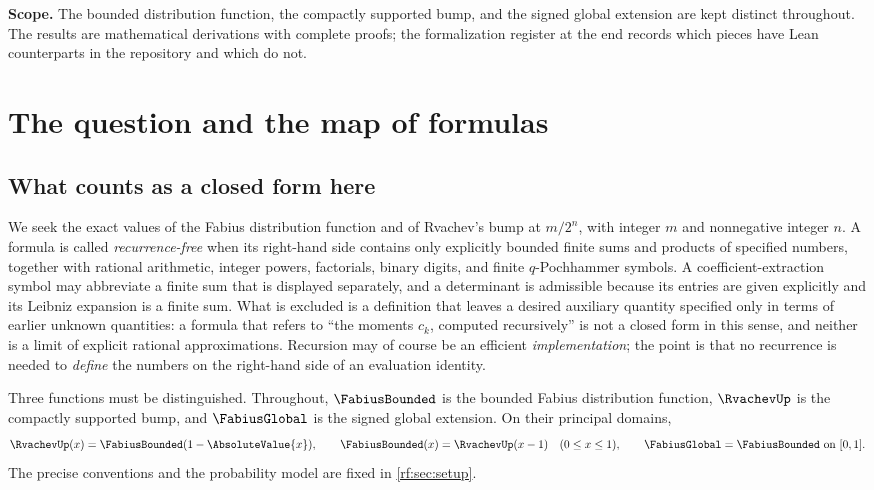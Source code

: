 \documentclass[11pt,oneside]{article}
\theoremstyle{plain}
\theoremstyle{definition}
\theoremstyle{remark}
\newcommand{\Fb}{\FabiusBounded}            %
\newcommand{\Fg}{\FabiusGlobal}             %
\newcommand{\up}{\RvachevUp}                %
\begin{document}
\vfill
\noindent\textbf{Scope.}  The bounded distribution function, the compactly
supported bump, and the signed global extension are kept distinct
throughout.  The results are mathematical derivations with complete proofs;
the formalization register at the end records which pieces have Lean
counterparts in the repository and which do not.

\clearpage
\tableofcontents
\clearpage

\section{The question and the map of formulas}
\label{rf:sec:intro}

\subsection{What counts as a closed form here}
\label{rf:sec:intro-closed}

We seek the exact values of the Fabius distribution function and of
Rvachev's bump at $m/2^{n}$, with integer $m$ and nonnegative integer $n$.
A formula is called \emph{recurrence-free} when its right-hand side
contains only explicitly bounded finite sums and products of specified
numbers, together with rational arithmetic, integer powers, factorials,
binary digits, and finite $q$-Pochhammer symbols.  A coefficient-extraction
symbol may abbreviate a finite sum that is displayed separately, and a
determinant is admissible because its entries are given explicitly and its
Leibniz expansion is a finite sum.  What is excluded is a definition that
leaves a desired auxiliary quantity specified only in terms of earlier
unknown quantities: a formula that refers to ``the moments $c_{k}$,
computed recursively'' is not a closed form in this sense, and neither is a
limit of explicit rational approximations.  Recursion may of course be an
efficient \emph{implementation}; the point is that no recurrence is needed
to \emph{define} the numbers on the right-hand side of an evaluation
identity.

Three functions must be distinguished.  Throughout, $\Fb$ is the bounded
Fabius distribution function, $\up$ is the compactly supported bump, and
$\Fg$ is the signed global extension.  On their principal domains,
\begin{equation}
 \up(x)=\Fb(1-\AbsoluteValue{x}),\qquad
 \Fb(x)=\up(x-1)\quad(0\le x\le1),\qquad
 \Fg=\Fb\ \text{on }[0,1].
 \label{rf:eq:intro-fold}
\end{equation}
The precise conventions and the probability model are fixed in
\cref{rf:sec:setup}.
\end{document}
